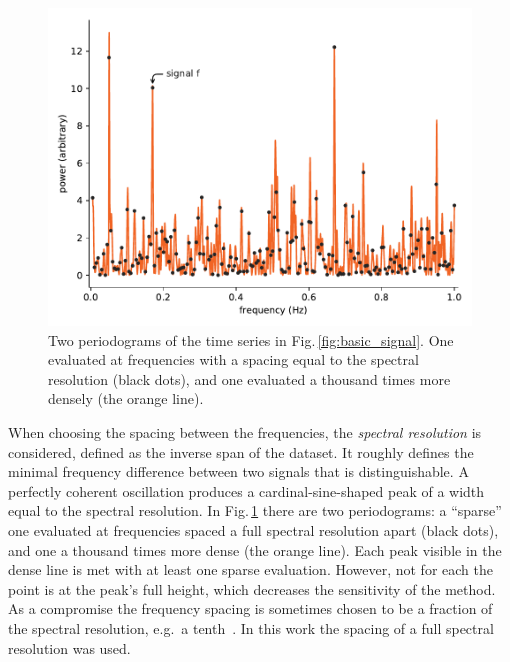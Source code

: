 \begin{figure}
  \centering \includegraphics[width=\linewidth]{gfx/axions/basic_periodogram.pdf}
  \caption{Two periodograms of the time series in Fig.\,\ref{fig:basic_signal}. One evaluated at frequencies with a spacing equal to the spectral resolution (black dots), and one evaluated a thousand times more densely (the orange line).}\label{fig:basic_periodogram}
\end{figure}

When choosing the spacing between the frequencies, the \emph{spectral resolution} is considered, defined as the inverse span of the dataset.
It roughly defines the minimal frequency difference between two signals that is distinguishable. A perfectly coherent oscillation produces a cardinal-sine-shaped peak of a width equal to the spectral resolution. 
In Fig.\,\ref{fig:basic_periodogram} there are two periodograms: a ``sparse'' one evaluated at frequencies spaced a full spectral resolution apart (black dots), and one a thousand times more dense (the orange line).
Each peak visible in the dense line is met with at least one sparse evaluation. However, not for each the point is at the peak's full height, which decreases the sensitivity of the method. As a compromise the frequency spacing is sometimes chosen to be a fraction of the spectral resolution, e.g.\ a tenth~\cite{Debosscher2007}. In this work the spacing of a full spectral resolution was used.

